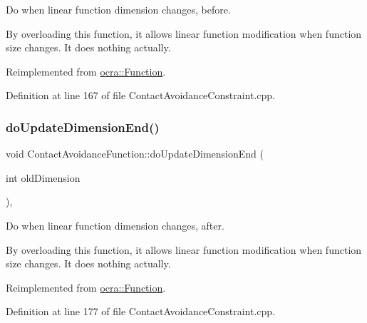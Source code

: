 Do when linear function dimension changes, before.

By overloading this function, it allows linear function modification when function size changes. It does nothing actually. 

Reimplemented from \hyperlink{classocra_1_1Function_afdf98e9f43fde97a5256af88a50cbb39}{ocra\+::\+Function}.



Definition at line 167 of file Contact\+Avoidance\+Constraint.\+cpp.

\hypertarget{classocra_1_1ContactAvoidanceFunction_ad81a7b03b0fb7e8b2a037bccf5faea84}{}\label{classocra_1_1ContactAvoidanceFunction_ad81a7b03b0fb7e8b2a037bccf5faea84} 
\subsubsection{\texorpdfstring{do\+Update\+Dimension\+End()}{doUpdateDimensionEnd()}}
{\footnotesize\ttfamily void Contact\+Avoidance\+Function\+::do\+Update\+Dimension\+End (\begin{DoxyParamCaption}\item[{int}]{old\+Dimension }\end{DoxyParamCaption})\hspace{0.3cm}{\ttfamily [protected]}, {\ttfamily [virtual]}}

Do when linear function dimension changes, after.

By overloading this function, it allows linear function modification when function size changes. It does nothing actually. 

Reimplemented from \hyperlink{classocra_1_1Function_a17aa280f0e6eff4a7569edc373a5147d}{ocra\+::\+Function}.



Definition at line 177 of file Contact\+Avoidance\+Constraint.\+cpp.

\hypertarget{classocra_1_1ContactAvoidanceFunction_aca5221cb617b3603e022040768974a20}{}\label{classocra_1_1ContactAvoidanceFunction_aca5221cb617b3603e022040768974a20} 
